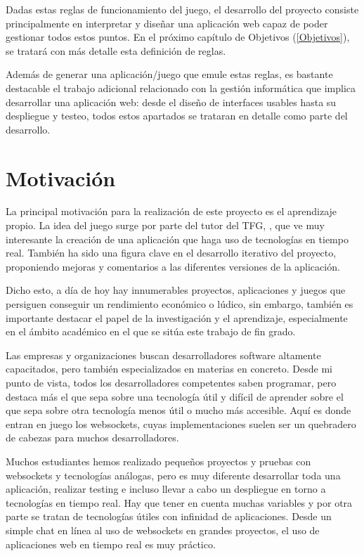 Dadas estas reglas de funcionamiento del juego, el desarrollo del proyecto consiste principalmente en
interpretar y diseñar una aplicación web capaz de poder gestionar todos estos puntos. En el próximo capítulo de Objetivos (\ref{Objetivos}),
se tratará con más detalle esta definición de reglas.

Además de generar una aplicación/juego que emule estas reglas, es bastante destacable el trabajo adicional relacionado con la gestión informática que
implica desarrollar una aplicación web: desde el diseño de interfaces usables hasta su despliegue y testeo, todos estos apartados se trataran en detalle
como parte del desarrollo.

\section{Motivación}

La principal motivación para la realización de este proyecto es el aprendizaje propio. La idea del juego
surge por parte del tutor del TFG, \nombretutor, que ve muy interesante la creación de una aplicación que haga uso de tecnologías en
tiempo real. También ha sido una figura clave en el desarrollo iterativo del proyecto, proponiendo mejoras y comentarios
a las diferentes versiones de la aplicación.

Dicho esto, a día de hoy hay innumerables proyectos, aplicaciones y juegos que persiguen conseguir un rendimiento económico o lúdico, sin embargo, también es importante destacar el papel
de la investigación y el aprendizaje, especialmente en el ámbito académico en el que se sitúa este trabajo de fin grado.

Las empresas y organizaciones buscan desarrolladores software altamente capacitados, pero también especializados en materias en concreto. Desde mi punto de vista,
todos los desarrolladores competentes saben programar, pero destaca más el que sepa sobre una tecnología útil y difícil de aprender sobre el que sepa
sobre otra tecnología menos útil o mucho más accesible. Aquí es donde entran en juego los websockets, cuyas implementaciones suelen ser un quebradero
de cabezas para muchos desarrolladores.

Muchos estudiantes hemos realizado pequeños proyectos y pruebas con websockets y tecnologías análogas, pero es muy diferente desarrollar toda una aplicación, realizar testing e
incluso llevar a cabo un despliegue en torno a tecnologías en tiempo real. Hay que tener en cuenta muchas variables y por otra parte se tratan de tecnologías útiles
con infinidad de aplicaciones. Desde un simple chat en línea al uso de websockets en grandes proyectos, el uso de aplicaciones web en tiempo real es muy práctico.

